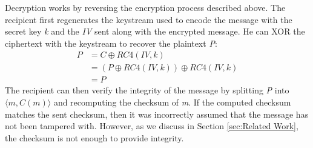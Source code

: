 \documentclass[11pt, twocolumn]{article} %
\begin{document}
Decryption works by reversing the encryption process described above.  The recipient first regenerates the keystream used to encode the message with the secret key \textit{k} and the \textit{IV} sent along with the encrypted message.  He can XOR the ciphertext with the keystream to recover the plaintext \textit{P}:
\begin{align*}
P &= C \oplus RC4(IV, k)\\
\nonumber &= (P \oplus RC4(IV, k)) \oplus RC4(IV, k)\\
\nonumber &= P
\end{align*}
The recipient can then verify the integrity of the message by splitting \textit{P} into $\langle m, C(m) \rangle$ and recomputing the checksum of \textit{m}.  If the computed checksum matches the sent checksum, then it was incorrectly assumed that the message has not been tampered with.   However, as we discuss in Section \ref{sec:Related Work}, the checksum is not enough to provide integrity. 
\end{document}
